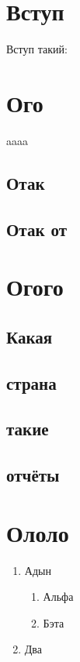 \tableofcontents
\thispagestyle{empty}

\chapter*{Вступ}
\pagestyle{fancy}
\setcounter{page}{3}
Вступ такий:

\lipsum

\chapter{Ого}
aaaa
\section{Отак}
\section{Отак от}

\chapter{Огого}
\section{Какая}
\lipsum[1]
\section{страна}
\lipsum[2]
\section{такие}
\lipsum[3]
\section{отчёты}
\lipsum[4]

\chapter{Ололо}
\begin{enumerate}
    \item Адын
        \begin{enumerate}
            \item Альфа
            \item Бэта
        \end{enumerate}
    \item Два
\end{enumerate}

